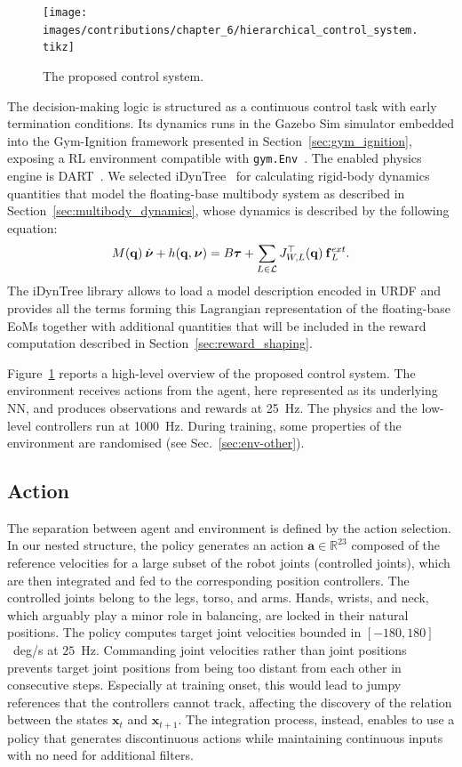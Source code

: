 \begin{figure}
    \centering
    \texttt{[image: images/contributions/chapter\_6/hierarchical\_control\_system.tikz]}
    \caption{The proposed control system.}
    \label{fig:hierarchical}
\end{figure}

The decision-making logic is structured as a continuous control task with early termination conditions.
Its dynamics runs in the Gazebo Sim simulator embedded into the Gym-Ignition framework presented in Section~\ref{sec:gym_ignition}, exposing a \ac{RL} environment compatible with \verb|gym.Env|~\parencite{brockman_openai_2016}.
The enabled physics engine is DART~\parencite{lee_dart_2018}.
We selected iDynTree~\parencite{nori_icub_2015} for calculating rigid-body dynamics quantities that model the floating-base multibody system as described in Section~\ref{sec:multibody_dynamics}, whose dynamics is described by the following equation:
%
\begin{equation}
    M(\mathbf{q}) \prescript{}{}{\dot{\boldsymbol{\nu}}} + h(\mathbf{q}, \prescript{}{}{\boldsymbol{\nu}}) = B \boldsymbol{\tau} + \sum_{L \in \mathcal{L}} J_{W,L}^\top(\mathbf{q}) \prescript{}{}{\mathbf{f}}_L^{ext}
    .
\end{equation}
%
The iDynTree library allows to load a model description encoded in \ac{URDF} and provides all the terms forming this Lagrangian representation of the floating-base \acp{EoM} together with additional quantities that will be included in the reward computation described in Section~\ref{sec:reward_shaping}.

Figure~\ref{fig:hierarchical} reports a high-level overview of the proposed control system.
The environment receives actions from the agent, here represented as its underlying \ac{NN}, and produces observations and rewards at 25~Hz.
The physics and the low-level \pid controllers run at 1000~Hz.
During training, some properties of the environment are randomised (see Sec.~\ref{sec:env-other}).

\pagebreak
\subsection{Action}

The separation between agent and environment is defined by the  action selection.
In our nested structure, the policy generates an action $\mathbf{a} \in \mathbb{R}^{23}$ composed of the reference velocities for a large subset of the robot joints (controlled joints), which are then integrated and fed to the corresponding \pid position controllers.
The controlled joints belong to the legs, torso, and arms.
Hands, wrists, and neck, which arguably play a minor role in balancing, are locked in their natural positions.
The policy computes target joint velocities bounded in $[-180,180]$~deg/s at $25$~Hz.
Commanding joint velocities rather than joint positions prevents target joint positions from being too distant from each other in consecutive steps.
Especially at training onset, this would lead to jumpy references that the \pid controllers cannot track, affecting the discovery of the relation between the states $\mathbf{x}_t$ and $\mathbf{x}_{t+1}$.
The integration process, instead, enables to use a policy that generates discontinuous actions while maintaining continuous \pid inputs with no need for additional filters.

